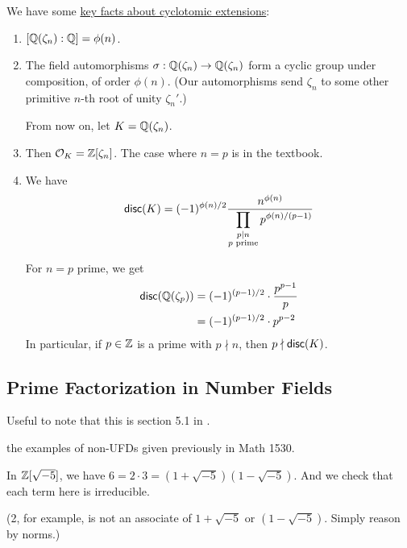We have some \ul{key facts about cyclotomic extensions}:
\begin{enumerate}[1)]
    \item $[\mathbb Q(\zeta_n) : \mathbb Q] = \phi(n)$.
    \item The field automorphisms $\sigma: \mathbb Q(\zeta_n)\to \mathbb Q(\zeta_n)$ form a cyclic group under composition, of order $\phi(n)$. (Our automorphisms send $\zeta_n$ to some other primitive $n$-th root of unity $\zeta_n'$.)

          From now on, let $K = \mathbb Q(\zeta_n)$.
    \item Then $\mathcal{O}_K = \mathbb Z[\zeta_n]$. The case where $n = p$ is in the textbook.
    \item We have
          \[\operatorname{\mathsf{disc}}(K) = (-1)^{\phi(n)/2}\frac{n^{\phi(n)}}{\displaystyle\prod_{\substack{p\mid n \\ p\text{ prime}}} p^{\phi(n)/(p-1)} }\]

          For $n = p$ prime, we get
          \begin{align*}
              \operatorname{\mathsf{disc}}(\mathbb Q(\zeta_p)) & = (-1)^{(p-1)/2}\cdot \frac{p^{p-1}}{p} \\
                                  & = (-1)^{(p-1)/2}\cdot p^{p-2}
          \end{align*}
          In particular, if $p\in\mathbb Z$ is a prime with $p\nmid n$, then $p\nmid \operatorname{\mathsf{disc}}(K)$.
\end{enumerate}

\subsection{Prime Factorization in Number Fields}
Useful to note that this is section 5.1 in \cite{stewart2015algebraic}.

\recall the examples of non-UFDs given previously in Math 1530.
\begin{example}
    In $\mathbb Z[\sqrt{-5}]$, we have $6 = 2\cdot 3 = (1 + \sqrt{-5})(1 - \sqrt{-5})$. And we check that each term here is irreducible.

    (2, for example, is not an associate of $1+\sqrt{-5}$ or $(1 - \sqrt{-5})$. Simply reason by norms.)
\end{example}

